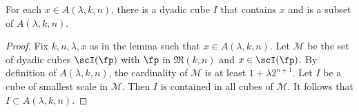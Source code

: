 \begin{lemma}
\label{dyadic-union}
\leanok
{}
For each $x\in A(\lambda,k,n)$,
there is a dyadic cube $I$
that contains $x$ and is
a subset of
$A(\lambda,k,n)$.
\end{lemma}

\begin{proof}
\leanok
Fix $k,n,\lambda,x$ as in the lemma such that $x\in A(\lambda,k,n)$.
Let $\mathcal{M}$ be the set of dyadic cubes $\scI(\fp)$ with $\fp$ in $\mathfrak{M}(k,n)$ and $x\in \scI(\fp)$.
By definition of $A(\lambda,k,n)$, the cardinality of $\mathcal{M}$ is at least $1+\lambda 2^{n+1}$.
Let $I$ be a cube of smallest scale in $\mathcal{M}$.
Then $I$ is contained in all cubes of $\mathcal{M}$.
It follows that $I\subset A(\lambda,k,n)$.
\end{proof}

